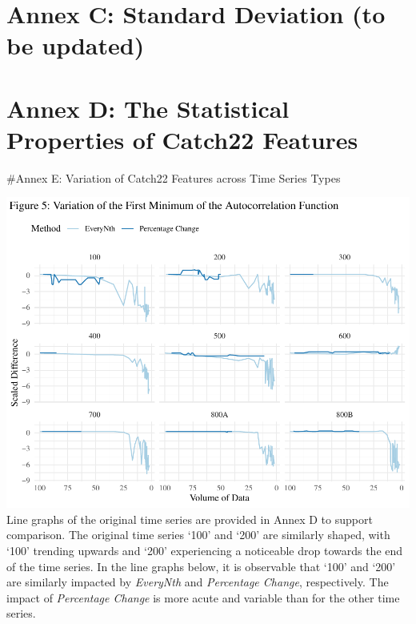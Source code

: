 \documentclass{article}
\begin{document}
\newpage

\hypertarget{annex-c-standard-deviation-to-be-updated}{%
\section{Annex C: Standard Deviation (to be
updated)}\label{annex-c-standard-deviation-to-be-updated}}

\newpage

\hypertarget{annex-d-the-statistical-properties-of-catch22-features}{%
\section{Annex D: The Statistical Properties of Catch22
Features}\label{annex-d-the-statistical-properties-of-catch22-features}}

\newpage

\#Annex E: Variation of Catch22 Features across Time Series Types

\includegraphics{210431461_CSC8639_Dissertation_files/figure-latex/FirstMinimum2-1.pdf}
Line graphs of the original time series are provided in Annex D to
support comparison. The original time series `100' and `200' are
similarly shaped, with `100' trending upwards and `200' experiencing a
noticeable drop towards the end of the time series. In the line graphs
below, it is observable that `100' and `200' are similarly impacted by
\emph{EveryNth} and \emph{Percentage Change}, respectively. The impact
of \emph{Percentage Change} is more acute and variable than for the
other time series.
\end{document}
